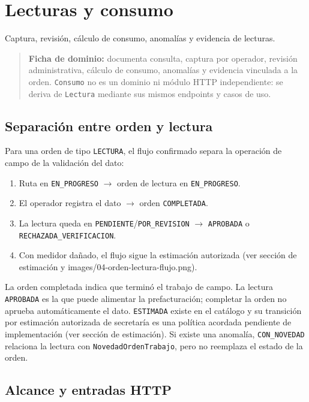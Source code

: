 \section{Lecturas y consumo}


Captura, revisión, cálculo de consumo, anomalías y evidencia de lecturas.


\begin{quote}
\textbf{Ficha de dominio:} documenta consulta, captura por operador, revisión administrativa, cálculo de consumo, anomalías y evidencia vinculada a la orden. \texttt{Consumo} no es un dominio ni módulo HTTP independiente: se deriva de \texttt{Lectura} mediante sus mismos endpoints y casos de uso.
\end{quote}


\subsection{Separación entre orden y lectura}

Para una orden de tipo \texttt{LECTURA}, el flujo confirmado separa la operación de campo de la validación del dato:

\begin{enumerate}
\item Ruta en \texttt{EN\_PROGRESO} $\rightarrow$ orden de lectura en \texttt{EN\_PROGRESO}.
\item El operador registra el dato $\rightarrow$ orden \texttt{COMPLETADA}.
\item La lectura queda en \texttt{PENDIENTE}/\texttt{POR\_REVISION} $\rightarrow$ \texttt{APROBADA} o \texttt{RECHAZADA\_VERIFICACION}.
\item Con medidor dañado, el flujo sigue la estimación autorizada (ver sección de estimación y {\ttfamily images/04-orden-lectura-flujo.png}).
\end{enumerate}

La orden completada indica que terminó el trabajo de campo. La lectura \texttt{APROBADA} es la que puede alimentar la prefacturación; completar la orden no aprueba automáticamente el dato. \texttt{ESTIMADA} existe en el catálogo y su transición por estimación autorizada de secretaría es una política acordada pendiente de implementación (ver sección de estimación). Si existe una anomalía, \texttt{CON\_NOVEDAD} relaciona la lectura con \texttt{NovedadOrdenTrabajo}, pero no reemplaza el estado de la orden.


\subsection{Alcance y entradas HTTP}


